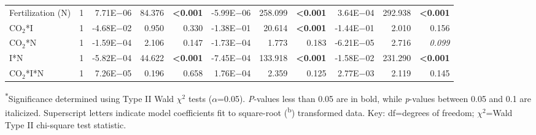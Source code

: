 \begin{landscape}
\begin{table}
{\begin{tabular}{p{3.5cm}p{0.5cm}p{1.75cm}p{1.5cm}p{1.5cm}p{1.75cm}p{1.5cm}p{1.5cm}p{1.75cm}p{1.5cm}p{1.5cm}}
            Fertilization (N) & \multicolumn{1}{r}{1}
            & \multicolumn{1}{r}{7.71E$-$06}      & \multicolumn{1}{r}{84.376}        & \multicolumn{1}{r}{\textbf{<0.001}}
            & \multicolumn{1}{r}{-5.99E$-$06}     & \multicolumn{1}{r}{258.099}       & \multicolumn{1}{r}{\textbf{<0.001}}
            & \multicolumn{1}{r}{3.64E$-$04}      & \multicolumn{1}{r}{292.938}       & \multicolumn{1}{r}{\textbf{<0.001}} 
            \\

            CO$_2$*I & \multicolumn{1}{r}{1}
            & \multicolumn{1}{r}{-4.68E$-$02}     & \multicolumn{1}{r}{0.950}         & \multicolumn{1}{r}{0.330}
            & \multicolumn{1}{r}{-1.38E$-$01}     & \multicolumn{1}{r}{20.614}        & \multicolumn{1}{r}{\textbf{<0.001}}
            & \multicolumn{1}{r}{-1.44E$-$01}     & \multicolumn{1}{r}{2.010}         & \multicolumn{1}{r}{0.156} 
            \\

            CO$_2$*N & \multicolumn{1}{r}{1}
            & \multicolumn{1}{r}{-1.59E$-$04}     & \multicolumn{1}{r}{2.106}         & \multicolumn{1}{r}{0.147}
            & \multicolumn{1}{r}{-1.73E$-$04}     & \multicolumn{1}{r}{1.773}         & \multicolumn{1}{r}{0.183}
            & \multicolumn{1}{r}{-6.21E$-$05}     & \multicolumn{1}{r}{2.716}         & \multicolumn{1}{r}{\textit{0.099}} 
            \\

            I*N & \multicolumn{1}{r}{1}
            & \multicolumn{1}{r}{-5.82E$-$04}     & \multicolumn{1}{r}{44.622}        & \multicolumn{1}{r}{\textbf{<0.001}}
            & \multicolumn{1}{r}{-7.45E$-$04}     & \multicolumn{1}{r}{133.918}       & \multicolumn{1}{r}{\textbf{<0.001}}
            & \multicolumn{1}{r}{-1.58E$-$02}     & \multicolumn{1}{r}{231.290}       & \multicolumn{1}{r}{\textbf{<0.001}} 
            \\

            CO$_2$*I*N & \multicolumn{1}{r}{1}
            & \multicolumn{1}{r}{7.26E$-$05}      & \multicolumn{1}{r}{0.196}         & \multicolumn{1}{r}{0.658}
            & \multicolumn{1}{r}{1.76E$-$04}      & \multicolumn{1}{r}{2.359}         & \multicolumn{1}{r}{0.125}
            & \multicolumn{1}{r}{2.77E$-$03}      & \multicolumn{1}{r}{2.119}         & \multicolumn{1}{r}{0.145} 
            \\
            \hline
    \end{tabular}}
    \label{tab:table5.5}
    \end{table}
\begin{singlespace}
    \noindent \textsuperscript{$*$}Significance determined using Type II Wald $\chi^2$ tests ($\alpha$=0.05). \textit{P}-values less than 0.05 are in bold, while \textit{p}-values between 0.05 and 0.1 are italicized. Superscript letters indicate model coefficients fit to square-root (\textsuperscript{b}) transformed data.  Key: df=degrees of freedom; $\chi^2$=Wald Type II chi-square test statistic.
\end{singlespace}
\end{landscape}
\clearpage

